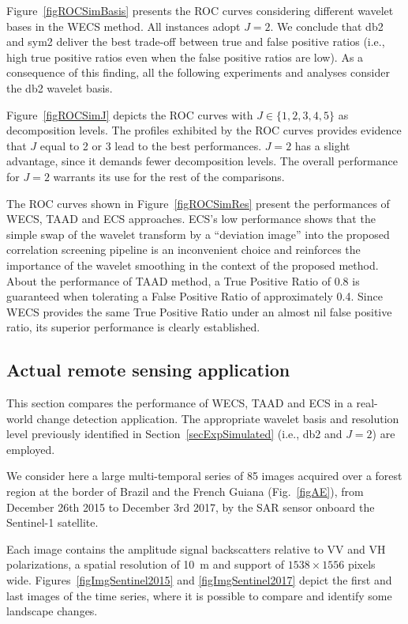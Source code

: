 \documentclass[journal]{IEEEtran}
\begin{document}
Figure~\ref{figROCSimBasis} presents the ROC curves considering different wavelet bases in the WECS method. All instances adopt $J=2$. We conclude that db2 and sym2 deliver the best trade-off between true and false positive ratios (i.e., high true positive ratios even when the false positive ratios are low).
As a consequence of this finding, all the following experiments and analyses consider the db2 wavelet basis.

Figure~\ref{figROCSimJ} depicts the ROC curves with $J \in \{1,2,3,4,5\}$ as decomposition levels. The profiles exhibited by the ROC curves provides evidence that $J$ equal to 2 or 3 lead to the best performances.  $J=2$ has a slight advantage, since it demands fewer decomposition levels. The overall performance for $J=2$ warrants its use for the rest of the comparisons.

The ROC curves shown in Figure~\ref{figROCSimRes} present the performances of WECS, TAAD and ECS approaches. 
ECS's low performance shows that the simple swap of the wavelet transform by a ``deviation image'' into the proposed correlation screening pipeline is an inconvenient choice and reinforces the importance of the wavelet smoothing in the context of the proposed method.
About the performance of TAAD method, a True Positive Ratio of 0.8 is guaranteed when tolerating a False Positive Ratio of approximately 0.4. 
Since WECS provides the same True Positive Ratio under an almost nil false positive ratio, its superior performance is clearly established.


\subsection{Actual remote sensing application}\label{secExpActual}


This section compares the performance of WECS, TAAD and ECS in a real-world change detection application. The appropriate wavelet basis and resolution level previously identified in Section~\ref{secExpSimulated} (i.e., db2 and $J=2$) are employed.

We consider here a large multi-temporal series of 85 images acquired over a forest region at the border of Brazil and the French Guiana (Fig.~\ref{figAE}), from December 26th 2015 to December 3rd 2017, by the SAR sensor onboard the Sentinel-1 satellite.


Each image contains the amplitude signal backscatters relative to VV and VH polarizations, a spatial resolution of \SI{10}{\meter} and support of $1538 \times 1556$ pixels wide.
Figures~\ref{figImgSentinel2015} and \ref{figImgSentinel2017} depict the first and last images of the time series, where it is possible to compare and identify some landscape changes.
\end{document}
